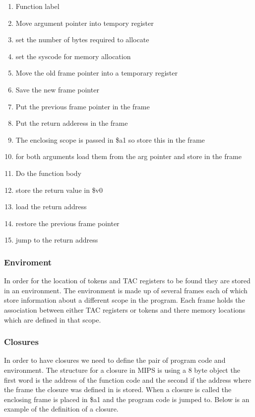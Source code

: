\documentclass{article}
\begin{document}
\begin{enumerate}
\item Function label
\item Move argument pointer into tempory register
\item set the number of bytes required to allocate
\item set the syscode for memory allocation
\item Move the old frame pointer into a temporary register
\item Save the new frame pointer
\item Put the previous frame pointer in the frame
\item Put the return adderess in the frame
\item The enclosing scope is passed in \$a1 so store this in the frame
\item for both arguments load them from the arg pointer and store in the frame
\item Do the function body
\item store the return value in \$v0
\item load the return address
\item restore the previous frame pointer
\item jump to the return address
\end{enumerate}

\subsubsection{Enviroment}
In order for the location of tokens and TAC registers to be found they are stored
in an environment. The environment is made up of several frames each of which store
information about a different scope in the program. Each frame holds the association
between either TAC registers or tokens and there memory locations which are defined
in that scope.

\subsubsection{Closures}

In order to have closures we need to define the pair of program code and environment.
The structure for a closure in MIPS is using a 8 byte object the first word is
the address of the function code and the second if the address where the frame
the closure was defined in is stored. When a closure is called the enclosing frame is
placed in \$a1 and the program code is jumped to. Below is an example of the definition
of a closure.
\end{document}
